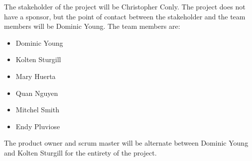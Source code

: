 The stakeholder of the project will be Christopher Conly. The project does not have a sponsor, but the point of contact between the stakeholder and the team members will be Dominic Young. The team members are:

\begin{itemize}
  \item Dominic Young
  \item Kolten Sturgill
  \item Mary Huerta
  \item Quan Nguyen
  \item Mitchel Smith
  \item Endy Pluviose
\end{itemize}

The product owner and scrum master will be alternate between Dominic Young and Kolten Sturgill for the entirety of the project.
